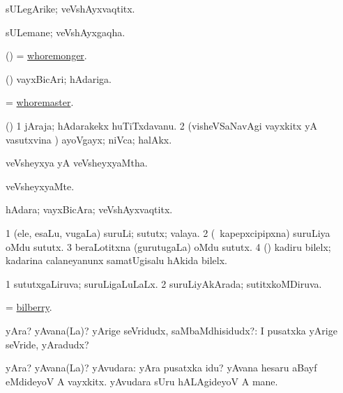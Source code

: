 \bentry
{}
\gl{\nA}
\bmng
sULegArike; veVshAyxvaqtitx. 
\emng
\eentry

\bentry
{}
\gl{\nA}
\bmng
sULemane; veVshAyxgaqha. 
\emng
\eentry

\bentry
{}
\gl{\nA}
\bmng
(\pArxparx) = \hyperlink{whoremonger}{whoremonger}. 
\emng
\eentry

\bentry
{}
\gl{\nA}
\bmng
(\pArxparx) vayxBicAri; hAdariga. 
\emng
\eentry

\bentry
{}
\gl{\nA}
\bmng
= \hyperlink{whoremaster}{whoremaster}. 
\emng
\eentry

\bentry
{}
\gl{\nA}
\bmng
(\pArxparx) 
\bnum
\num{1} jAraja; hAdarakekx huTiTxdavanu. 
\num{2} (visheVSaNavAgi vayxkitx yA vasutxvina \vi) ayoVgayx; niVca; halAkx. 
\enum
\emng
\eentry

\bentry
{}
\gl{\gu}
\bmng
veVsheyxya yA veVsheyxyaMtha. 
\emng
\eentry

\bentry
{}
\gl{\kirxvi}
\bmng
veVsheyxyaMte. 
\emng
\eentry

\bentry
{}
\gl{\nA}
\bmng
hAdara; vayxBicAra; veVshAyxvaqtitx. 
\emng
\eentry

\bentry
{}
\gl{\nA}
\expl{}
\bmng
\bnum
\num{1} (ele, esaLu, \mo vugaLa) suruLi; sututx; valaya. 
\num{2} (\kanmu\ kapepxcipipxna) suruLiya oMdu sututx. 
\num{3} beraLotitxna (gurutugaLa) oMdu sututx. 
\num{4} (\pArxparx) kadiru bilelx; kadarina calaneyanunx samatUgisalu hAkida bilelx. 
\enum
\emng
\eentry

\bentry
{}
\gl{\gu}
\bmng
\bnum
\num{1} sututxgaLiruva; suruLigaLuLaLx.
\num{2} suruLiyAkArada; sutitxkoMDiruva. 
\enum
\emng
\eentry

\bentry
{}
\gl{\nA}
\bmng
= \hyperref{kandict_b.pdf}{B}{bilberry}{bilberry}. 
\emng
\eentry

\bentry
{} 
\gl{\sanA}
\expl{}
\bmng
yAra? yAvana(La)? yArige seVridudx, saMbaMdhisidudx?:  I pusatxka yArige seVride, yAradudx? 
\emng
\eentry

\bentry
{} 
\gl{\gu}
\bmng
yAra? yAvana(La)? yAvudara:  yAra pusatxka idu?  yAvana hesaru aBayf eMdideyoV A vayxkitx.  yAvudara sUru hALAgideyoV A mane. 
\emng
\eentry

